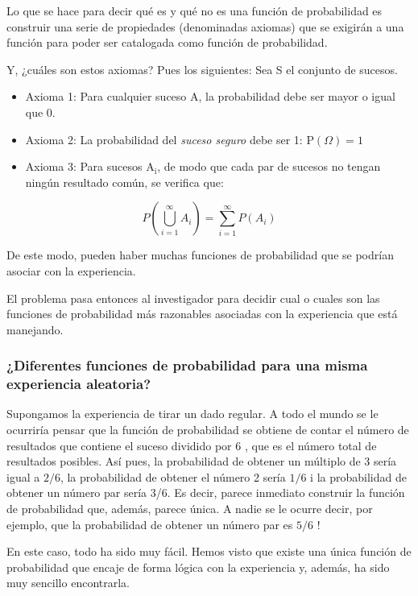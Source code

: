 \documentclass[
]{article}
\begin{document}
Lo que se hace para decir qué es y qué no es una función de probabilidad
es construir una serie de propiedades (denominadas axiomas) que se
exigirán a una función para poder ser catalogada como función de
probabilidad.

Y, ¿cuáles son estos axiomas? Pues los siguientes: Sea S el conjunto de
sucesos.

\begin{itemize}
\item
  Axioma 1: Para cualquier suceso A, la probabilidad debe ser
  mayor o igual que 0.
\item
  Axioma 2: La probabilidad del \emph{suceso seguro} debe ser 1: \(\mathrm{P}(\Omega)=1\)
\item
  Axioma 3: Para sucesos \(\mathrm{A}_{\mathrm{i}}\), de modo que cada par de sucesos no
  tengan ningún resultado común, se verifica que:
\end{itemize}

\[
P\left(\bigcup_{i=1}^{\infty} A_{i}\right)=\sum_{i=1}^{\infty} P\left(A_{i}\right)
\]

De este modo, pueden haber muchas funciones de probabilidad que se
podrían asociar con la experiencia.

El problema pasa entonces al investigador para decidir cual o cuales son
las funciones de probabilidad más razonables asociadas con la
experiencia que está manejando.

\subsubsection{¿Diferentes funciones de probabilidad para una misma experiencia aleatoria?}\label{diferentes-funciones-de-probabilidad-para-una-misma-experiencia-aleatoria}

Supongamos la experiencia de tirar un dado regular. A todo el mundo se
le ocurriría pensar que la función de probabilidad se obtiene de contar
el número de resultados que contiene el suceso dividido por 6 , que es
el número total de resultados posibles. Así pues, la probabilidad de
obtener un múltiplo de 3 sería igual a \(2 / 6\), la probabilidad de
obtener el número 2 sería \(1 / 6\) i la probabilidad de obtener un número
par sería 3/6. Es decir, parece inmediato construir la función de
probabilidad que, además, parece única. A nadie se le ocurre decir, por
ejemplo, que la probabilidad de obtener un número par es \(5 / 6\) !

En este caso, todo ha sido muy fácil. Hemos visto que existe una única
función de probabilidad que encaje de forma lógica con la experiencia y,
además, ha sido muy sencillo encontrarla.
\end{document}

